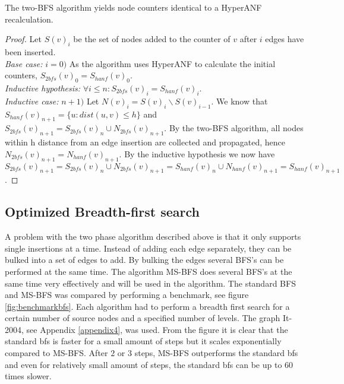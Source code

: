 \begin{theorem} The two-BFS algorithm yields node counters identical to a HyperANF recalculation.

\begin{proof}Let $S(v)_i$ be the set of nodes added to the counter of $v$ after $i$ edges have been inserted.\\

\noindent\textit{Base case:} $i = 0)$ As the algorithm uses HyperANF to calculate the initial counters, $S_{2bfs}(v)_0 = S_{hanf}(v)_0$.\\

\noindent\textit{Inductive hypothesis: } $\forall i \leq n : S_{2bfs}(v)_i = S_{hanf}(v)_i$.\\

\noindent\textit{Inductive case: } $n + 1)$ Let $N(v)_i = S(v)_i \backslash S(v)_{i-1}$.  We know that $S_{hanf}(v)_{n+1} = \{ u : dist(u,v) \leq h \}$ and $S_{2bfs}(v)_{n+1} = S_{2bfs}(v)_{n} \cup N_{2bfs}(v)_{n+1}$. By the two-BFS algorithm, all nodes within h distance from an edge insertion are collected and propagated, hence $N_{2bfs}(v)_{n+1} = N_{hanf}(v)_{n+1}$. By the inductive hypothesis we now have $S_{2bfs}(v)_{n+1} = S_{2bfs}(v)_n \cup N_{2bfs}(v)_{n+1} = S_{hanf}(v)_n \cup N_{hanf}(v)_{n+1} = S_{hanf}(v)_{n+1}$.
\end{proof}
\end{theorem}

\subsection{Optimized Breadth-first search}

A problem with the two phase algorithm described above is that it only supports single insertions at a time. Instead of adding each edge separately, they can be bulked into a set of edges to add. By bulking the edges several BFS's can be performed at the same time. The algorithm MS-BFS \cite{msbfs} does several BFS's at the same time very effectively and will be used in the algorithm. The standard BFS and MS-BFS was compared by performing a benchmark, see figure \ref{fig:benchmarkbfs}. Each algorithm had to perform a breadth first search for a certain number of source nodes and a specified number of levels. The graph It-2004, see Appendix \ref{appendix4}, was used. From the figure it is clear that the standard bfs is faster for a small amount of steps but it scales exponentially compared to MS-BFS. After $2$ or $3$ steps, MS-BFS outperforms the standard bfs and even for relatively small amount of steps, the standard bfs can be up to $60$ times slower.

